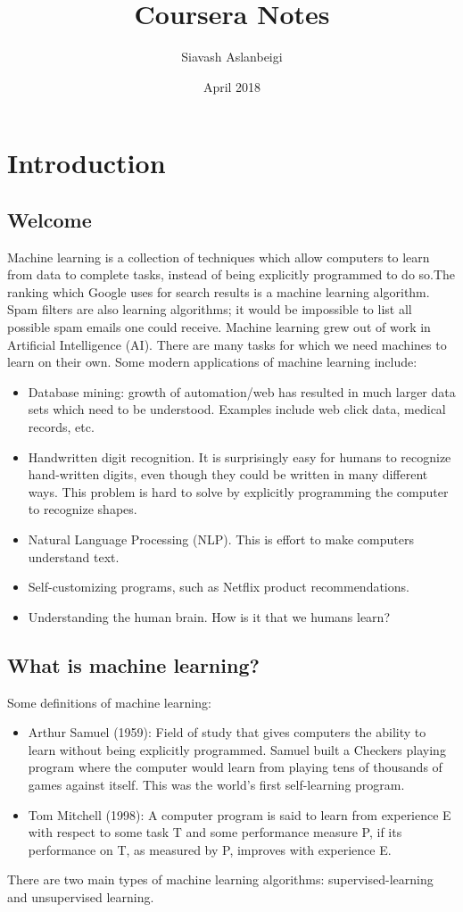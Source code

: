 \documentclass{article}
\title{Coursera Notes}
\author{Siavash Aslanbeigi}
\date{April 2018}
\begin{document}
\maketitle

\section{Introduction}
\subsection{Welcome}
Machine learning is a collection of techniques which allow computers to learn from data to complete tasks, instead of being explicitly programmed to do so.The ranking which Google uses for search results is a machine learning algorithm. Spam filters are also learning algorithms; it would be impossible to list all possible spam emails one could receive. Machine learning grew out of work in Artificial Intelligence (AI). There are many tasks for which we need machines to learn on their own. Some modern applications of machine learning include:
\begin{itemize}
    \item Database mining: growth of automation/web has resulted in much larger data sets which need to be understood. Examples include web click data, medical records, etc.
    \item Handwritten digit recognition. It is surprisingly easy for humans to recognize hand-written digits, even though they could be written in many different ways. This problem is hard to solve by explicitly programming the computer to recognize shapes.
    \item Natural Language Processing (NLP). This is effort to make computers understand text.
    \item Self-customizing programs, such as Netflix product recommendations.
    \item Understanding the human brain. How is it that we humans learn?
\end{itemize}

\subsection{What is machine learning?}
Some definitions of machine learning:
\begin{itemize}
    \item Arthur Samuel (1959): Field of study that gives computers the ability to learn without being explicitly programmed. Samuel built a Checkers playing program where the computer would learn from playing tens of thousands of games against itself. This was the world's first self-learning program.
    \item Tom Mitchell (1998): A computer program is said to learn from experience E with respect to some task T and some performance measure P, if its performance on T, as measured by P, improves with experience E.
\end{itemize}
There are two main types of machine learning algorithms: supervised-learning and unsupervised learning.
\end{document}

